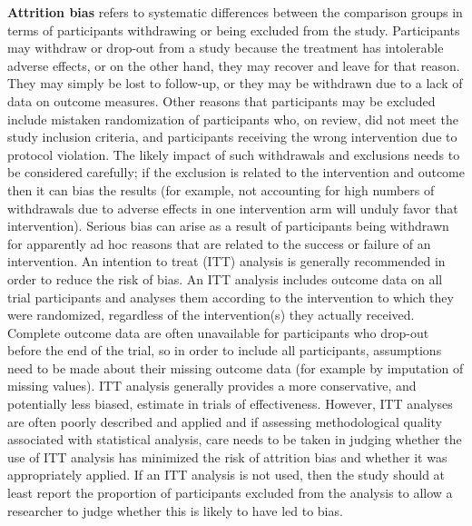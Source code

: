 \documentclass[
  11pt,
  a4paper,
  DIV=11,
  numbers=noendperiod]{scrreprt}
\begin{document}
\textbf{Attrition bias} refers to systematic differences between the
comparison groups in terms of participants withdrawing or being excluded
from the study. Participants may withdraw or drop-out from a study
because the treatment has intolerable adverse effects, or on the other
hand, they may recover and leave for that reason. They may simply be
lost to follow-up, or they may be withdrawn due to a lack of data on
outcome measures. Other reasons that participants may be excluded
include mistaken randomization of participants who, on review, did not
meet the study inclusion criteria, and participants receiving the wrong
intervention due to protocol violation. The likely impact of such
withdrawals and exclusions needs to be considered carefully; if the
exclusion is related to the intervention and outcome then it can bias
the results (for example, not accounting for high numbers of withdrawals
due to adverse effects in one intervention arm will unduly favor that
intervention). Serious bias can arise as a result of participants being
withdrawn for apparently ad hoc reasons that are related to the success
or failure of an intervention. An intention to treat (ITT) analysis is
generally recommended in order to reduce the risk of bias. An ITT
analysis includes outcome data on all trial participants and analyses
them according to the intervention to which they were randomized,
regardless of the intervention(s) they actually received. Complete
outcome data are often unavailable for participants who drop-out before
the end of the trial, so in order to include all participants,
assumptions need to be made about their missing outcome data (for
example by imputation of missing values). ITT analysis generally
provides a more conservative, and potentially less biased, estimate in
trials of effectiveness. However, ITT analyses are often poorly
described and applied and if assessing methodological quality associated
with statistical analysis, care needs to be taken in judging whether the
use of ITT analysis has minimized the risk of attrition bias and whether
it was appropriately applied. If an ITT analysis is not used, then the
study should at least report the proportion of participants excluded
from the analysis to allow a researcher to judge whether this is likely
to have led to bias.
\end{document}
